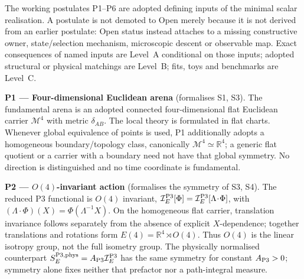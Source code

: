 \documentclass[11pt,a4paper]{article}
\begin{document}
The working postulates P1--P6 are adopted defining inputs of the minimal
scalar realisation.  A postulate is not demoted to Open merely because it is
not derived from an earlier postulate: Open status instead attaches to a
missing constructive owner, state/selection mechanism, microscopic descent or
observable map.  Exact consequences of named inputs are Level~A conditional
on those inputs; adopted structural or physical matchings are Level~B; fits,
toys and benchmarks are Level~C.

\textbf{P1 --- Four-dimensional Euclidean arena} (formalises S1, S3).
The fundamental arena is an adopted connected four-dimensional flat Euclidean
carrier $\mathcal M^4$ with metric $\delta_{AB}$.  The local theory is
formulated in flat charts.  Whenever global equivalence of points is used, P1
additionally adopts a homogeneous boundary/topology class, canonically
$\mathcal M^4\simeq\mathbb R^4$; a generic flat quotient or a carrier with a
boundary need not have that global symmetry.  No direction is distinguished
and no time coordinate is fundamental.

\textbf{P2 --- $O(4)$-invariant action} (formalises the symmetry of S3, S4).
The reduced P3 functional is $O(4)$ invariant,
$\mathcal I_E^{\rm P3}[\Phi]
=\mathcal I_E^{\rm P3}[\Lambda\!\cdot\!\Phi]$, with
$(\Lambda\!\cdot\!\Phi)(X)=\Phi(\Lambda^{-1}X)$.  On the homogeneous flat
carrier, translation invariance follows separately from the absence of
explicit $X$-dependence; together translations and rotations form
$E(4)=\mathbb R^4\rtimes O(4)$.  Thus $O(4)$ is the linear isotropy group, not
the full isometry group.  The physically normalised counterpart
$S_E^{{\rm P3},{\rm phys}}=A_{\rm P3}\mathcal I_E^{\rm P3}$ has the same
symmetry for constant $A_{\rm P3}>0$; symmetry alone fixes neither that
prefactor nor a path-integral measure.
\end{document}
